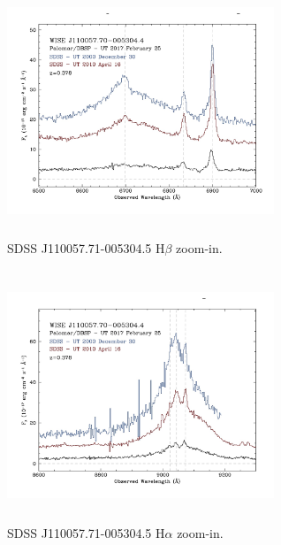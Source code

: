 \documentclass[apj]{emulateapj}
\begin{document}
\begin{figure}
  \includegraphics[width=8.00cm, height=7.50cm, trim=0.0cm 0.0cm 0.0cm 0.0cm, clip]
  {../plots/spectra/w1100m0052_hbeta.jpg}
  \centering
  \caption[]{SDSS J110057.71-005304.5 H$\beta$ zoom-in.}
 \label{fig:w1100m0052_hbeta}
\end{figure}

\begin{figure}
  \includegraphics[width=8.00cm, height=7.50cm, trim=0.0cm 0.0cm 0.0cm 0.0cm, clip]
  {../plots/spectra/w1100m0052_halpha.jpg}
  \centering
  \caption[]{SDSS J110057.71-005304.5 H$\alpha$ zoom-in.}
 \label{fig:w1100m0052_halpha}
\end{figure}



\end{document}
